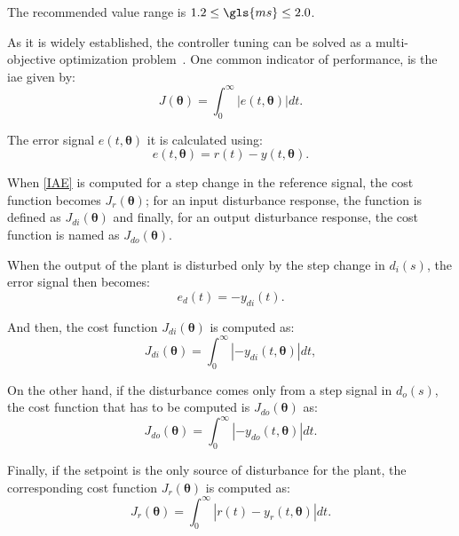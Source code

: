 The recommended value range is  $1.2\leq \gls{ms} \leq 2.0$.

As it is widely established, the controller tuning can be solved as a multi-objective optimization problem~\cite{Gambier2007}. One common indicator of performance, is the \gls{iae} given by:
%
\begin{equation}  %
J(\bm{\theta})=\int_0^\infty \left |{e(t,\bm{\theta})}\right | dt.
\label{IAE}
\end{equation}

The error signal $e(t, \bm{\theta})$ it is calculated using:
%
\begin{equation}  %
e(t,\bm{\theta})=r(t)-y(t,\bm{\theta}).
\label{error}
\end{equation}

When \eqref{IAE} is computed for a step change in the reference signal, the cost function becomes $J_r(\bm{\theta})$; for an input disturbance response, the function is defined as $J_{di}(\bm{\theta})$ and finally, for an output disturbance response, the cost function is named as $J_{do}(\bm{\theta})$.

When the output of the plant is disturbed only by the step change in $d_i(s)$, the error signal then becomes:
\begin{equation}  %
e_d(t)=-y_{di}(t)
\label{per}.
\end{equation}

And then, the cost function $J_{di}(\bm{\theta})$ is computed as:
\begin{equation}  %
J_{di}(\bm{\theta})= \int_0^\infty  \left |-{y_{di}(t,\bm{\theta})}\right | dt,
\label{perin}
\end{equation}

On the other hand, if the disturbance comes only from a step signal in $d_o(s)$, the cost function that has to be computed is $J_{do}(\bm{\theta})$ as:
%
\begin{equation}  %
J_{do}(\bm{\theta})= \int_0^\infty  \left |-{y_{do}(t,\bm{\theta})}\right | dt.
\label{perout}
\end{equation}	
%

Finally, if the setpoint is the only source of disturbance for the plant, the corresponding cost function $J_r(\bm{\theta})$ is computed as:
\begin{equation}  %
J_r(\bm{\theta})=\int_0^\infty \left |r(t)-y_r(t,\bm{\theta})\right | dt.
\label{eq:Jr}
\end{equation}
%

